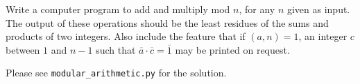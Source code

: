 \begin{exercise}\label{ex0.3.16}
    Write a computer program to add and multiply mod $n$, for any $n$ given as input. The output of these operations should be the least residues of the sums and products of two integers. Also include the feature that if $(a, n) = 1$, an integer $c$ between $1$ and $n - 1$ such that $\bar a \cdot \bar c = \bar 1$ may be printed on request. 
    
\end{exercise}

\begin{sol}
    Please see \verb|modular_arithmetic.py| for the solution.
\end{sol}